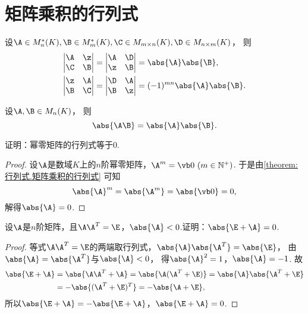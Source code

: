 \section{矩阵乘积的行列式}
\begin{lemma}
设\(\A\in M_n^*(K),
\B\in M_m^*(K),
\C\in M_{m\times n}(K),
\D\in M_{n\times m}(K)\)，
则\begin{align}
	\begin{vmatrix}
		\A & \z \\
		\C & \B
	\end{vmatrix}
	&= \begin{vmatrix}
		\A & \D \\
		\z & \B
	\end{vmatrix}
	= \abs{\A} \abs{\B}, \label{equation:行列式.广义三角阵的行列式1} \\
	\begin{vmatrix}
		\z & \A \\
		\B & \C
	\end{vmatrix}
	&= \begin{vmatrix}
		\D & \A \\
		\B & \z
	\end{vmatrix}
	= (-1)^{mn} \abs{\A} \abs{\B}. \label{equation:行列式.广义三角阵的行列式2}
\end{align}
\end{lemma}

\begin{theorem}[矩阵乘积的行列式定理]\label{theorem:行列式.矩阵乘积的行列式}
设\(\A,\B\in M_n(K)\)，
则\begin{equation}
	\abs{\A \B} = \abs{\A} \abs{\B}.
\end{equation}
\end{theorem}

\begin{example}\label{example:幂零矩阵.幂零矩阵的行列式}
证明：幂零矩阵的行列式等于\(0\).
\begin{proof}
设\(\A\)是数域\(K\)上的\(n\)阶幂零矩阵，\(\A^m = \vb0\ (m\in\mathbb{N}^+)\).
于是由\cref{theorem:行列式.矩阵乘积的行列式} 可知\[
	\abs{\A}^m
	= \abs{\A^m}
	= \abs{\vb0}
	= 0,
\]
解得\(\abs{\A} = 0\).
\end{proof}
\end{example}

\begin{example}
设\(\A\)是\(n\)阶矩阵，且\(\A\A^T = \E\)，\(\abs{\A}<0\).证明：\(\abs{\E+\A}=0\).
\begin{proof}
等式\(\A\A^T=\E\)的两端取行列式，\(\abs{\A} \abs{\A^T} = \abs{\E}\)，
由\(\abs{\A} = \abs{\A^T}\)与\(\abs{\A} < 0\)，
得\(\abs{\A}^2 = 1\)，\(\abs{\A} = -1\).
故\begin{align*}
	\abs{\E+\A}
	&= \abs{\A\A^T+\A}
	= \abs{\A(\A^T+\E)}
	= \abs{\A} \abs{\A^T+\E} \\
	&= -\abs{(\A^T+\E)^T}
	= -\abs{\A+\E},
\end{align*}
所以\(\abs{\E+\A} = -\abs{\E+\A}\)，\(\abs{\E+\A}=0\).
\end{proof}
\end{example}

